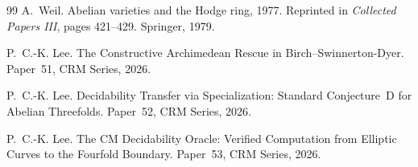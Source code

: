 \documentclass[11pt]{article}
\theoremstyle{definition}
\theoremstyle{remark}
\begin{document}
\begin{thebibliography}{99}
A.~Weil.
\newblock Abelian varieties and the Hodge ring, 1977.
\newblock Reprinted in \emph{Collected Papers III}, pages 421--429. Springer, 1979.

P.~C.-K. Lee.
\newblock The Constructive Archimedean Rescue in Birch--Swinnerton-Dyer.
\newblock Paper~51, CRM Series, 2026.

P.~C.-K. Lee.
\newblock Decidability Transfer via Specialization: Standard Conjecture~D for Abelian Threefolds.
\newblock Paper~52, CRM Series, 2026.

P.~C.-K. Lee.
\newblock The CM Decidability Oracle: Verified Computation from Elliptic Curves to the Fourfold Boundary.
\newblock Paper~53, CRM Series, 2026.

\end{thebibliography}
\end{document}
